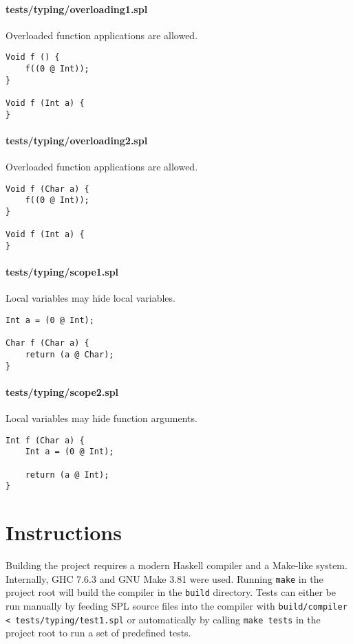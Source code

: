 \documentclass[a4paper]{article}
\begin{document}
\paragraph{tests/typing/overloading1.spl} Overloaded function applications are allowed.
    \begin{verbatim}
Void f () {
    f((0 @ Int));
}

Void f (Int a) {
}
    \end{verbatim}

\paragraph{tests/typing/overloading2.spl} Overloaded function applications are allowed.
    \begin{verbatim}
Void f (Char a) {
    f((0 @ Int));
}

Void f (Int a) {
}
    \end{verbatim}

\paragraph{tests/typing/scope1.spl} Local variables may hide local variables.
    \begin{verbatim}
Int a = (0 @ Int);

Char f (Char a) {
    return (a @ Char);
}
    \end{verbatim}

\paragraph{tests/typing/scope2.spl} Local variables may hide function arguments.
    \begin{verbatim}
Int f (Char a) {
    Int a = (0 @ Int);

    return (a @ Int);
}
    \end{verbatim}

\section*{Instructions}
Building the project requires a modern Haskell compiler and a Make-like system. Internally, GHC 7.6.3 and GNU Make 3.81 were used. Running \verb|make| in the project root will build the compiler in the \verb|build| directory. Tests can either be run manually by feeding SPL source files into the compiler with \verb|build/compiler < tests/typing/test1.spl| or automatically by calling \verb|make tests| in the project root to run a set of predefined tests.
\end{document}
